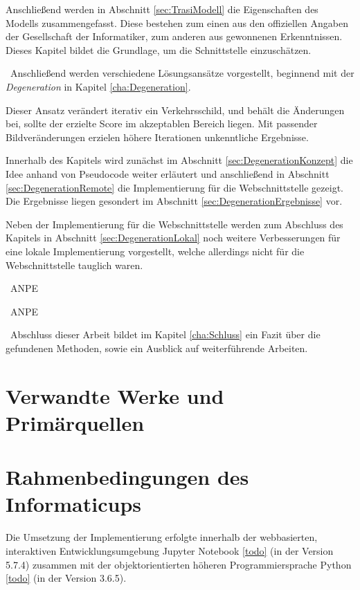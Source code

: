 Anschließend werden in Abschnitt \ref{sec:TrasiModell} die Eigenschaften des Modells zusammengefasst. 
Diese bestehen zum einen aus den offiziellen Angaben der Gesellschaft der Informatiker, zum anderen aus gewonnenen Erkenntnissen. Dieses Kapitel bildet die Grundlage, um die Schnittstelle einzuschätzen. 

~\newline Anschließend werden verschiedene Lösungsansätze vorgestellt, beginnend mit der \textit{Degeneration} in Kapitel \ref{cha:Degeneration}. 

Dieser Ansatz verändert iterativ ein Verkehrsschild, und behält die Änderungen bei, sollte der erzielte Score im akzeptablen Bereich liegen. Mit passender Bildveränderungen erzielen höhere Iterationen unkenntliche Ergebnisse. 

Innerhalb des Kapitels wird zunächst im Abschnitt \ref{sec:DegenerationKonzept} die Idee anhand von Pseudocode weiter erläutert und anschließend in Abschnitt  \ref{sec:DegenerationRemote} die Implementierung für die Webschnittstelle gezeigt. Die Ergebnisse liegen gesondert im Abschnitt \ref{sec:DegenerationErgebnisse} vor. 

Neben der Implementierung für die Webschnittstelle werden zum Abschluss des Kapitels in Abschnitt \ref{sec:DegenerationLokal} noch weitere Verbesserungen für eine lokale Implementierung vorgestellt, welche allerdings nicht für die Webschnittstelle tauglich waren.

~\newline ANPE 

~\newline ANPE 

~\newline Abschluss dieser Arbeit bildet im Kapitel \ref{cha:Schluss} ein Fazit über die gefundenen Methoden, sowie ein Ausblick auf weiterführende Arbeiten. 
\section{Verwandte Werke und Primärquellen}
\label{sec:VerwandteWerke}

\section{Rahmenbedingungen des Informaticups}
Die Umsetzung der Implementierung erfolgte innerhalb der webbasierten, interaktiven Entwicklungsumgebung Jupyter Notebook \ref{todo} (in der Version 5.7.4) zusammen mit der objektorientierten höheren Programmiersprache Python \ref{todo} (in der Version 3.6.5).


